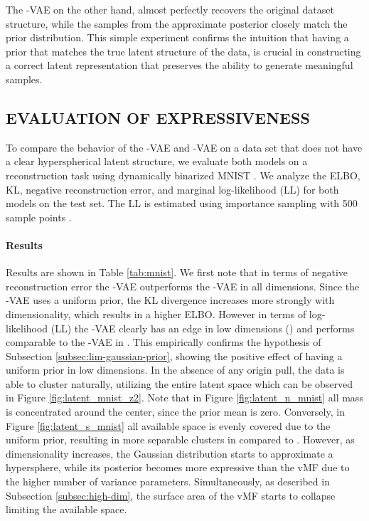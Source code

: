\documentclass[letterpaper]{article}
\newcommand{\Sv}{}
\newcommand{\Nv}{}
\begin{document}
The \Sv-VAE on the other hand, almost perfectly recovers the original dataset structure, while the samples from the approximate posterior closely match the prior distribution. This simple experiment confirms the intuition that having a prior that matches the true latent structure of the data, is crucial in constructing a correct latent representation that preserves the ability to generate meaningful samples. 

\subsection{EVALUATION OF EXPRESSIVENESS} \label{subsec:mnist}
To compare the behavior of the -VAE and -VAE on a data set that does not have a clear hyperspherical latent structure, we evaluate both models on a reconstruction task using dynamically binarized MNIST \citep{salakhutdinov2008quantitative}. We analyze the ELBO, KL, negative reconstruction error, and marginal log-likelihood (LL) for both models on the test set. The LL is estimated using importance sampling with 500 sample points \citep{burda2015importance}.

\paragraph{Results}
Results are shown in Table \ref{tab:mnist}. We first note that in terms of negative reconstruction error the \Sv-VAE outperforms the \Nv-VAE in all dimensions. Since the \Sv-VAE uses a uniform prior, the KL divergence increases more strongly with dimensionality, which results in a higher ELBO. However in terms of log-likelihood (LL) the \Sv-VAE clearly has an edge in low dimensions () and performs comparable to the \Nv-VAE in . This empirically confirms the hypothesis of Subsection \ref{subsec:lim-gaussian-prior}, showing the positive effect of having a uniform prior in low dimensions. In the absence of any origin pull, the data is able to cluster naturally, utilizing the entire latent space which can be observed in Figure \ref{fig:latent_mnist_z2}. Note that in Figure \ref{fig:latent_n_mnist} all mass is concentrated around the center, since the prior mean is zero. Conversely, in Figure \ref{fig:latent_s_mnist} all available space is evenly covered due to the uniform prior, resulting in more separable clusters in  compared to . However, as dimensionality increases, the Gaussian distribution starts to approximate a hypersphere, while its posterior becomes more expressive than the vMF due to the higher number of variance parameters. Simultaneously, as described in Subsection \ref{subsec:high-dim}, the surface area of the vMF starts to collapse limiting the available space.
\end{document}
